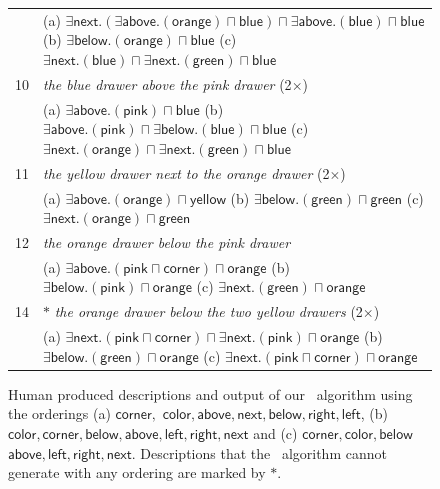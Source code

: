 \begin{figure}[thb]
\begin{small}
\begin{tabular}{|lp{}|}
& (a) $\exists \mathsf{next}.(\exists \mathsf{above}.(\mathsf{orange}) \sqcap \mathsf{blue}) \sqcap \exists \mathsf{above}.(\mathsf{blue}) \sqcap \mathsf{blue}$  (b) $\exists \mathsf{below}.(\mathsf{orange}) \sqcap \mathsf{blue}$  (c) $\exists \mathsf{next}.(\mathsf{blue}) \sqcap \exists \mathsf{next}.(\mathsf{green}) \sqcap \mathsf{blue}$\\
10 & \textit{the blue drawer above the pink drawer} (2$\times$)\\
& (a) $\exists \mathsf{above}.(\mathsf{pink}) \sqcap \mathsf{blue}$  (b) $\exists \mathsf{above}.(\mathsf{pink}) \sqcap \exists \mathsf{below}.(\mathsf{blue}) \sqcap \mathsf{blue}$  (c) $\exists \mathsf{next}.(\mathsf{orange}) \sqcap \exists \mathsf{next}.(\mathsf{green}) \sqcap \mathsf{blue}$\\
11 & \textit{the yellow drawer next to the orange drawer} (2$\times$)\\
& (a) $\exists \mathsf{above}.(\mathsf{orange}) \sqcap \mathsf{yellow}$  (b) $\exists \mathsf{below}.(\mathsf{green}) \sqcap \mathsf{green}$  (c) $\exists \mathsf{next}.(\mathsf{orange}) \sqcap \mathsf{green}$\\
12 & \textit{the orange drawer below the pink drawer}\\ 
& (a) $\exists \mathsf{above}.(\mathsf{pink} \sqcap \mathsf{corner}) \sqcap \mathsf{orange}$  (b) $\exists \mathsf{below}.(\mathsf{pink}) \sqcap \mathsf{orange}$  (c) $\exists \mathsf{next}.(\mathsf{green}) \sqcap \mathsf{orange}$\\
14 & $\ast$ \textit{the orange drawer below the two yellow drawers} (2$\times$)\\
& (a) $\exists \mathsf{next}.(\mathsf{pink} \sqcap \mathsf{corner}) \sqcap \exists \mathsf{next}.(\mathsf{pink}) \sqcap \mathsf{orange}$  (b) $\exists \mathsf{below}.(\mathsf{green}) \sqcap \mathsf{orange}$  (c) $\exists \mathsf{next}.(\mathsf{pink} \sqcap \mathsf{corner}) \sqcap \mathsf{orange}$\\\hline
\end{tabular}
\end{small}

\caption{Human produced descriptions and output of our \el\  algorithm
using the orderings (a) $\mathsf{corner,}$ $\mathsf{color, above,
next, below, right, left}$, (b) $\mathsf{color, corner, below, above,
left, right, next}$ and (c) $\mathsf{corner, color, below}$
$\mathsf{above, left, right, next}$. Descriptions that the \el\
algorithm cannot generate with any ordering are marked by $\ast$.}
\label{fig:example_outputs}
\end{figure}



